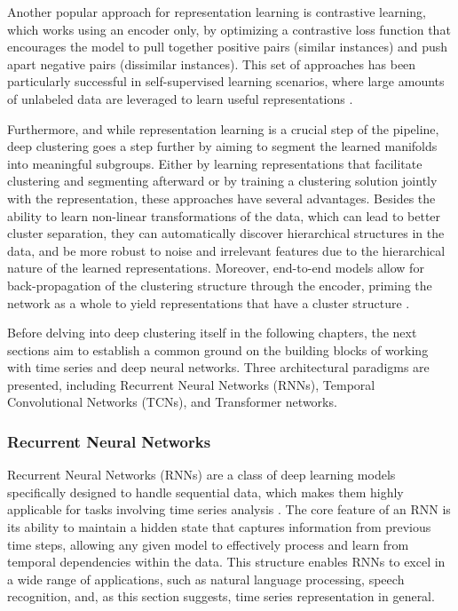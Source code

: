 Another popular approach for representation learning is contrastive learning, which works using an encoder only, by optimizing a contrastive loss function that encourages the model to pull together positive pairs (similar instances) and push apart negative pairs (dissimilar instances). This set of approaches has been particularly successful in self-supervised learning scenarios, where large amounts of unlabeled data are leveraged to learn useful representations \cite{Le-Khac2020ContrastiveReview}.

Furthermore, and while representation learning is a crucial step of the pipeline, deep clustering goes a step further by aiming to segment the learned manifolds into meaningful subgroups. Either by learning representations that facilitate clustering and segmenting afterward or by training a clustering solution jointly with the representation, these approaches have several advantages. Besides the ability to learn non-linear transformations of the data, which can lead to better cluster separation, they can automatically discover hierarchical structures in the data, and be more robust to noise and irrelevant features due to the hierarchical nature of the learned representations. Moreover, end-to-end models allow for back-propagation of the clustering structure through the encoder, priming the network as a whole to yield representations that have a cluster structure \cite{Lafabregue2022End-to-endStudy}.

Before delving into deep clustering itself in the following chapters, the next sections aim to establish a common ground on the building blocks of working with time series and deep neural networks. Three architectural paradigms are presented, including Recurrent Neural Networks (RNNs), Temporal Convolutional Networks (TCNs), and Transformer networks.

\subsubsection{Recurrent Neural Networks}

Recurrent Neural Networks (RNNs) are a class of deep learning models specifically designed to handle sequential data, which makes them highly applicable for tasks involving time series analysis \cite{Lipton2015ALearning}. The core feature of an RNN is its ability to maintain a hidden state that captures information from previous time steps, allowing any given model to effectively process and learn from temporal dependencies within the data. This structure enables RNNs to excel in a wide range of applications, such as natural language processing, speech recognition, and, as this section suggests, time series representation in general.


